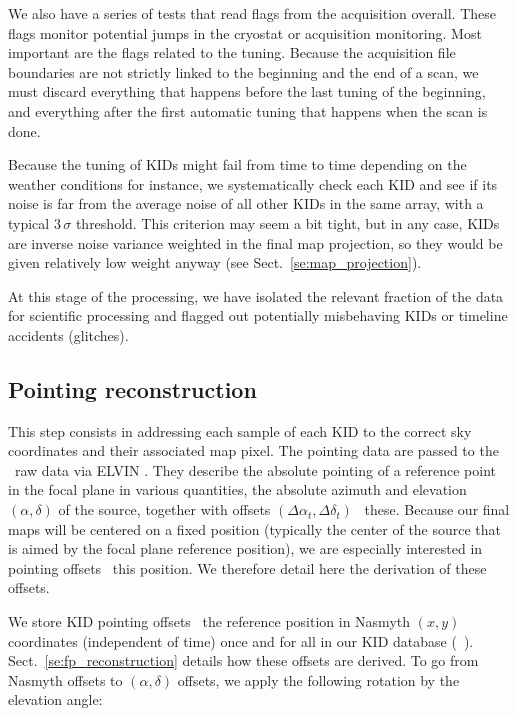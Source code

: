 We also have a series of tests that read flags from the acquisition
overall. These flags monitor potential jumps in the cryostat or acquisition
monitoring. Most important are the flags related to the tuning. Because the
acquisition file boundaries are not strictly linked to the beginning and the end of
a scan, we must discard everything that happens before the last tuning of the
beginning, and everything after the first automatic tuning that happens when the
scan is done.

Because the tuning of KIDs might fail from time to time depending on the weather
conditions for instance, we systematically check each KID and see if its noise
is far from the average noise of all other KIDs in the same array, with a
typical $3\,\sigma$ threshold. This criterion may seem a bit tight, but in any case, KIDs
are inverse noise variance weighted in the final map projection, so they would
be given relatively low weight anyway (see Sect.~\ref{se:map_projection}).

At this stage of the processing, we have isolated the relevant fraction of the
data for scientific processing and flagged out potentially misbehaving KIDs or
timeline accidents (glitches).

\subsection{Pointing reconstruction}
\label{se:ptg}

This step consists in addressing each sample of each KID to the correct sky
coordinates and their associated map pixel. The pointing data are passed to the
\nika\ raw data via ELVIN . They describe the absolute
pointing of a reference point in the focal plane in various quantities, the
absolute azimuth and elevation $(\alpha,\delta)$ of the source, together with
offsets $(\Delta\alpha_t, \Delta\delta_t)$ \wrt~these. Because our final maps
will be centered on a fixed position (typically the center of the source that is
aimed by the focal plane reference position), we are especially interested in
pointing offsets \wrt~this position. We therefore detail here the derivation of
these offsets.

We store KID pointing offsets \wrt\ the reference position in Nasmyth $(x,y)$
coordinates (independent of time) once and for all in our KID database
(\aka~\kidpar). Sect.~\ref{se:fp_reconstruction} details how these offsets are
derived. To go from Nasmyth offsets to $(\alpha,\delta)$ offsets, we apply the
following rotation by the elevation angle:

